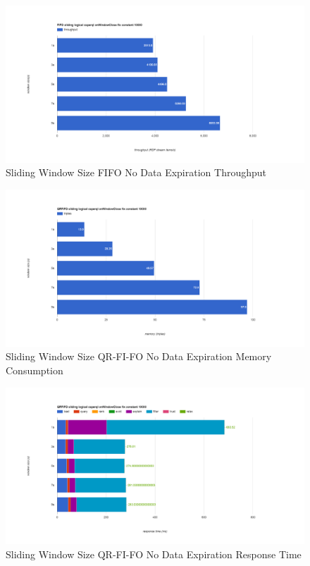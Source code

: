 \begin{figure}[!htbp]
    \centering
    \includegraphics[width=\textwidth]{img/app3-slide-ws-fifo-no-t.png}
    \caption{Sliding Window Size FIFO No Data Expiration Throughput}
\end{figure}
\begin{figure}[!htbp]
    \centering
    \includegraphics[width=\textwidth]{img/app3-slide-ws-qrfifo-no-m.png}
    \caption{Sliding Window Size QR-FI-FO No Data Expiration Memory Consumption}
\end{figure}
\begin{figure}[!htbp]
    \centering
    \includegraphics[width=\textwidth]{img/app3-slide-ws-qrfifo-no-r.png}
    \caption{Sliding Window Size QR-FI-FO No Data Expiration Response Time}
\end{figure}
